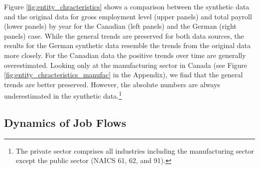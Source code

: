 Figure \ref{fig:entity_chracteristics} shows a comparison between the synthetic data and the original data for gross employment level (upper panels) and total payroll (lower panels) by year for the Canadian (left panels) and the German (right panels) case. While the general trends are preserved for both data sources, the results for the German synthetic data resemble the trends from the original data more closely. For the Canadian data the positive trends over time are generally overestimated. Looking only at the manufacturing sector in Canada (see Figure \ref{fig:entity_chracteristics_manufac} in the Appendix), we find that the general trends are better preserved. However, the absolute numbers are always underestimated in the synthetic data.\footnote{The private sector comprises all industries including the manufacturing sector except the public sector  (NAICS 61, 62, and 91).} 





\subsection{Dynamics of Job Flows}

